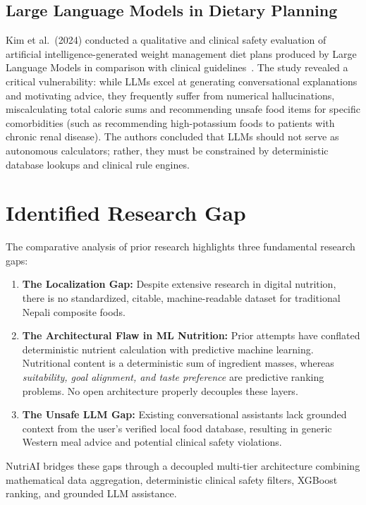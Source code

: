 \documentclass[12pt,a4paper]{report}
\begin{document}
\subsection{Large Language Models in Dietary Planning}
Kim et al.\ (2024) conducted a qualitative and clinical safety evaluation of artificial intelligence-generated weight management diet plans produced by Large Language Models in comparison with clinical guidelines~\cite{kim2024}. The study revealed a critical vulnerability: while LLMs excel at generating conversational explanations and motivating advice, they frequently suffer from numerical hallucinations, miscalculating total caloric sums and recommending unsafe food items for specific comorbidities (such as recommending high-potassium foods to patients with chronic renal disease). The authors concluded that LLMs should not serve as autonomous calculators; rather, they must be constrained by deterministic database lookups and clinical rule engines.

\section{Identified Research Gap}

The comparative analysis of prior research highlights three fundamental research gaps:
\begin{enumerate}[leftmargin=*]
  \item \textbf{The Localization Gap:} Despite extensive research in digital nutrition, there is no standardized, citable, machine-readable dataset for traditional Nepali composite foods.
  \item \textbf{The Architectural Flaw in ML Nutrition:} Prior attempts have conflated deterministic nutrient calculation with predictive machine learning. Nutritional content is a deterministic sum of ingredient masses, whereas \textit{suitability, goal alignment, and taste preference} are predictive ranking problems. No open architecture properly decouples these layers.
  \item \textbf{The Unsafe LLM Gap:} Existing conversational assistants lack grounded context from the user's verified local food database, resulting in generic Western meal advice and potential clinical safety violations.
\end{enumerate}

NutriAI bridges these gaps through a decoupled multi-tier architecture combining mathematical data aggregation, deterministic clinical safety filters, XGBoost ranking, and grounded LLM assistance.
\end{document}
